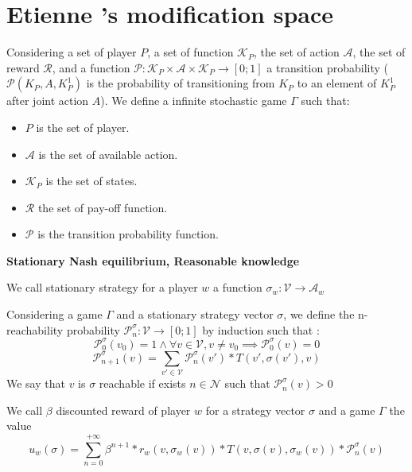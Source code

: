 \section{Etienne 's modification space}

\begin{mydef}
	Considering a set of player $P$, a set of function $\mathcal{K}_P$, the set of action $\mathcal{A}$, the set of reward $\mathcal{R}$, and a function $\mathcal{P} : \mathcal{K}_P \times \mathcal{A} \times \mathcal{K}_P \rightarrow [0;1]$ a transition probability ($\mathcal{P}(K_P,A,K_P^{1})$ is the probability of transitioning from $K_P$ to an element of $K_P^{1}$ after joint action $A$).
	We define a infinite stochastic game $\Gamma$  such that:
	\begin{itemize}
		\item $P$ is the set of player.
		\item $\mathcal{A}$ is the set of available action.
		\item $\mathcal{K}_P$ is the set of states.
		\item $\mathcal{R}$ the set of pay-off function.
		\item $\mathcal{P}$ is the transition probability function.
	\end{itemize}
\end{mydef}


\medskip
\noindent
\textbf{Stationary Nash equilibrium, Reasonable knowledge}

\begin{mydef}
	We call stationary strategy for a player $w$ a function $\sigma_w : \mathcal{V} \rightarrow \mathcal{A}_w$ 
\end{mydef}

\begin{mydef}
	Considering a game $\Gamma$ and a stationary strategy vector $\sigma$, 
	we define the n-reachability probability $\mathcal{P}^\sigma_n : \mathcal{V} \rightarrow [0;1]$ by induction such that :
		$$\mathcal{P}^\sigma_0(v_0) = 1 \land \forall v \in \mathcal{V},  v \neq v_0 \implies \mathcal{P}^\sigma_0(v) = 0$$
		$$\mathcal{P}^\sigma_{n+1}(v) = \sum_{v' \in \mathcal{V}} \mathcal{P}^\sigma_{n}(v') * T(v',\sigma(v'),v)$$
	We say that $v$ is $\sigma$ reachable if exists $n \in \mathcal{N}$ such that $\mathcal{P}^\sigma_{n}(v) > 0$
\end{mydef}


\begin{mydef}
	We call $\beta$ discounted reward of player $w$ for a strategy vector $\sigma$ and a game $\Gamma$ the value 
	$$u_w(\sigma) = 	\sum_{n=0}^{+\infty}\beta^{n+1} * r_w(v,\sigma_w(v)) * T(v,\sigma(v),\sigma_w(v))*\mathcal{P}^\sigma_{n}(v) $$
\end{mydef}

